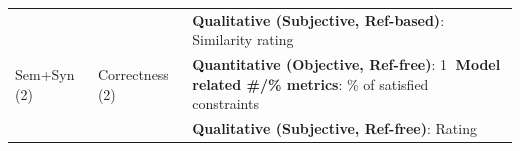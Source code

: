 \begin{tabular} { p{} p{} p{} }
 &  & \textbf{\colorbox[HTML]{F3ECF8}{Qualitative} (\colorbox[HTML]{FFF2E5}{Subjective}, \colorbox[HTML]{E8F5F3}{Ref-based})}: Similarity rating~\cite{ \paperonehundredseventyseventh }\\ 
Sem+Syn (2) & Correctness (2) & \textbf{\colorbox[HTML]{EAF2FB}{Quantitative} (\colorbox[HTML]{EAF5EC}{Objective}, \colorbox[HTML]{FFF7DF}{Ref-free})}: \textcircled{1} \textbf{Model related \#/\% metrics}: \% of satisfied constraints~\cite{ \papertwohundredtwentyfourth }\\ 
 &  & \textbf{\colorbox[HTML]{F3ECF8}{Qualitative} (\colorbox[HTML]{FFF2E5}{Subjective}, \colorbox[HTML]{FFF7DF}{Ref-free})}: Rating~\cite{ \papertwohundredfortieth }\\ 
\bottomrule 
\end{tabular} 
